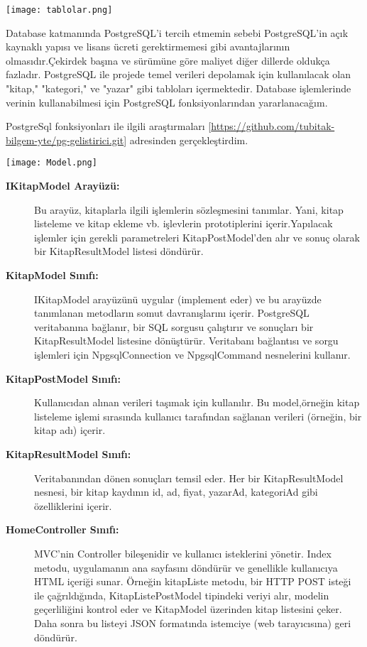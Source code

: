 

\texttt{[image: tablolar.png]} \newline



Database katmanında PostgreSQL'i tercih etmemin sebebi PostgreSQL'in açık kaynaklı yapısı ve lisans ücreti gerektirmemesi gibi avantajlarının olmasıdır.Çekirdek başına ve sürümüne göre maliyet diğer dillerde oldukça fazladır. PostgreSQL ile projede temel verileri depolamak için kullanılacak olan "kitap," "kategori," ve "yazar" gibi tabloları içermektedir.
Database işlemlerinde verinin kullanabilmesi için PostgreSQL fonksiyonlarından yararlanacağım.
\vspace{1\baselineskip} %
\newline

	PostgreSql fonksiyonları ile ilgili araştırmaları [\url{https://github.com/tubitak-bilgem-yte/pg-gelistirici.git}] adresinden gerçekleştirdim.\newline 
	
	\centering
	\texttt{[image: Model.png]} \newline


\begin{description}
	\item[\textbf{IKitapModel Arayüzü:}] Bu arayüz, kitaplarla ilgili işlemlerin sözleşmesini tanımlar. Yani, kitap listeleme ve kitap ekleme vb. işlevlerin prototiplerini içerir.Yapılacak işlemler için gerekli parametreleri KitapPostModel'den alır ve sonuç olarak bir KitapResultModel listesi döndürür.
	\item[\textbf{KitapModel Sınıfı:}] IKitapModel arayüzünü uygular (implement eder) ve bu arayüzde tanımlanan metodların somut davranışlarını içerir.
	PostgreSQL veritabanına bağlanır, bir SQL sorgusu çalıştırır ve sonuçları bir KitapResultModel listesine dönüştürür.
	Veritabanı bağlantısı ve sorgu işlemleri için NpgsqlConnection ve NpgsqlCommand nesnelerini kullanır.
	\item[\textbf{ KitapPostModel Sınıfı:}] Kullanıcıdan alınan verileri taşımak için kullanılır. Bu model,örneğin kitap listeleme işlemi sırasında kullanıcı tarafından sağlanan verileri (örneğin, bir kitap adı) içerir.
	\item[\textbf{KitapResultModel Sınıfı:}] Veritabanından dönen sonuçları temsil eder. Her bir KitapResultModel nesnesi, bir kitap kaydının id, ad, fiyat, yazarAd, kategoriAd gibi özelliklerini içerir.
	\item[\textbf{HomeController Sınıfı:}] MVC'nin Controller bileşenidir ve kullanıcı isteklerini yönetir.
	Index metodu, uygulamanın ana sayfasını döndürür ve genellikle kullanıcıya HTML içeriği sunar.	Örneğin kitapListe metodu, bir HTTP POST isteği ile çağrıldığında, KitapListePostModel tipindeki veriyi alır, modelin geçerliliğini kontrol eder ve KitapModel üzerinden kitap listesini çeker. Daha sonra bu listeyi JSON formatında istemciye (web tarayıcısına) geri döndürür.
\end{description}

